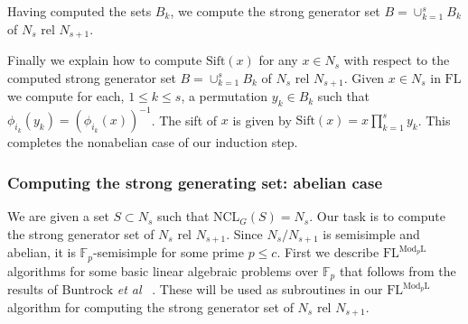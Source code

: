 \documentclass[11pt]{madras}%
\theoremstyle{remark}
\newcommand{\ModkL}[1]{{\ensuremath{\mathrm{Mod}_{#1}\mathrm{L}}}}
\newcommand{\etal}[0]{{\emph{et al}}}
\newcommand{\NCL}[2][]{\ensuremath{\mathrm{NCL}_{#1}({#2})}}
\newcommand{\Sift}[1]{{\ensuremath{\mathrm{Sift}({#1})}}}
\begin{document}
Having computed the sets $B_k$, we compute the strong generator set
$B = \cup_{k=1}^s B_k$ of $N_s$ rel $N_{s+1}$.%
\\


Finally we explain how to compute $\Sift{x}$ for any $x\in N_s$ with
respect to the computed strong generator set $B = \cup_{k=1}^s B_k$ of
$N_s$ rel $N_{s+1}$. Given $x \in N_s$ in $\mathrm{FL}$ we compute for
each, $1 \leq k \leq s$, a permutation $y_k \in B_k$ such that
$\phi_{i_k}(y_k)=(\phi_{i_k}(x))^{-1}$.  The sift of $x$ is given by
$\Sift{x}=x\prod_{k=1}^s y_k$.  This completes the nonabelian case of
our induction step.
 
\subsubsection{Computing the strong generating set: abelian case}

We are given a set $S \subset N_s$ such that $\NCL[G]{S} = N_s$. Our
task is to compute the strong generator set of $N_s$ rel $N_{s+1}$.
Since $N_s/N_{s+1}$ is semisimple and abelian, it is
$\mathbb{F}_p$-semisimple for some prime $p \leq c$.  First we
describe $\mathrm{FL}^{\ModkL{p}}$ algorithms for some basic linear
algebraic problems over $\mathbb{F}_p$ that follows from the results of
Buntrock \etal~\cite{buntrock92structure} . These will be used as
subroutines in our $\mathrm{FL}^{\ModkL{p}}$ algorithm for computing
the strong generator set of $N_s$ rel $N_{s+1}$.
\end{document}
